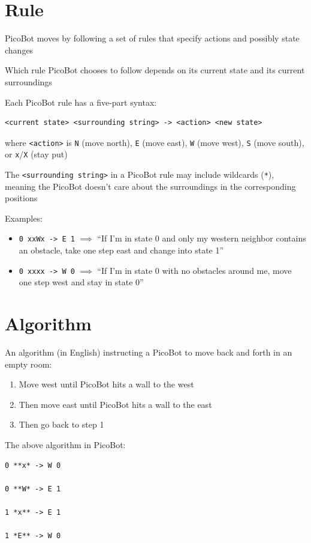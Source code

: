 \documentclass[8pt,a4paper,compress]{beamer}
\begin{document}
\section{Rule}
\begin{frame}[fragile]
\pause
PicoBot moves by following a set of rules that specify actions and possibly state changes

\pause
\bigskip

Which rule PicoBot chooses to follow depends on its current state and its current surroundings

\pause
\bigskip
Each PicoBot rule has a five-part syntax:
\begin{lstlisting}[language={}]
<current state> <surrounding string> -> <action> <new state>
\end{lstlisting}
where \lstinline{<action>} is \lstinline{N} (move north), \lstinline{E} (move east), \lstinline{W} (move west), \lstinline{S} (move south), or \lstinline{x}/\lstinline{X} (stay put)

\pause
\bigskip

The \lstinline{<surrounding string>} in a PicoBot rule may include wildcards (\lstinline{*}), meaning the PicoBot doesn't care about the surroundings in the corresponding positions

\pause
\bigskip

Examples:
\begin{itemize}
\item \lstinline{0 xxWx -> E 1} $\implies$ ``If I'm in state 0 and only my western neighbor contains an obstacle, take one step east and change into state 1''

\item \lstinline{0 xxxx -> W 0} $\implies$ ``If I'm in state 0 with no obstacles around me, move one step west and stay in state 0''
\end{itemize}
\end{frame}

\section{Algorithm}
\begin{frame}[fragile]
\pause
An algorithm (in English) instructing a PicoBot to move back and forth in an empty room:
\begin{enumerate}
\item Move west until PicoBot hits a wall to the west

\item Then move east until PicoBot hits a wall to the east

\item Then go back to step 1
\end{enumerate}

\pause
\bigskip

The above algorithm in PicoBot:
\begin{lstlisting}[language={}]
0 **x* -> W 0

0 **W* -> E 1

1 *x** -> E 1

1 *E** -> W 0
\end{lstlisting}
\end{frame}
\end{document}
